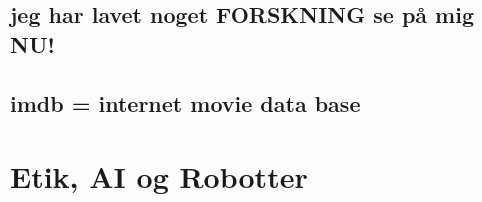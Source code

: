 \documentclass[11pt, fleqn]{article}
\begin{document}
	\subsection*{jeg har lavet noget FORSKNING se på mig NU!}
	\vspace*{-0.2cm}
	\subsection*{imdb = internet movie data base}
	\vspace*{-0.2cm}
	
	 
	\section*{Etik, AI og Robotter}
	
	\subsection*{}
	\vspace*{-0.2cm}
	
	
\end{document}
